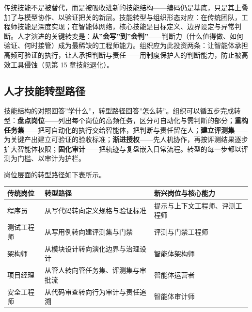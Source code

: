 \documentclass[
]{ctexbook}
\newcounter{none}
\begin{document}
传统技能不是被替代，而是被吸收进新的技能结构------编码仍是基底，只是其上叠加了与模型协作、以验证把关的新层。技能转型与组织形态对应：在传统团队，工程师技能是深度实现；在智能体网络，核心技能是目标定义、边界设定与异常判断。人才演进的关键转变是：\textbf{从''会写''到''会判''}------判断力（什么值得做、如何验证、何时接管）成为最稀缺的工程师能力。组织应为此投资两条：让智能体承担高频可验证的执行，让人承担判断与责任------用制度保护人的判断能力，防止被高效工具侵蚀（见第
15 章技能退化）。

\subsection{人才技能转型路径}\label{ux4ebaux624dux6280ux80fdux8f6cux578bux8defux5f84}

技能结构的对照回答''学什么''，转型路径回答''怎么转''。组织可以循五步完成转型：\textbf{盘点岗位}------列出每个岗位的高频任务，区分可自动化与需判断的部分；\textbf{重构任务集}------把可自动化的执行交给智能体，把判断与责任留在人；\textbf{建立评测集}------为关键产出建立可验证的验收标准；\textbf{渐进授权}------先人机协作，再按评测结果逐步扩大智能体权限；\textbf{固化审计}------把轨迹与复盘嵌入日常流程。转型的每一步都以评测为门槛、以审计为护栏。

岗位层面的转型路径如下表所示。

{\def\LTcaptype{none} %
\begin{longtable}[]{@{}
  >{\raggedright\arraybackslash}p{}
  >{\raggedright\arraybackslash}p{}
  >{\raggedright\arraybackslash}p{}@{}}
\toprule\noalign{}
\begin{minipage}[b]{\linewidth}\raggedright
传统岗位
\end{minipage} & \begin{minipage}[b]{\linewidth}\raggedright
转型路径
\end{minipage} & \begin{minipage}[b]{\linewidth}\raggedright
新兴岗位与核心能力
\end{minipage} \\
\midrule\noalign{}
\endhead
\bottomrule\noalign{}
\endlastfoot
程序员 & 从写代码转向定义规格与验证标准 &
提示与上下文工程师、评测工程师 \\
测试工程师 & 从写用例转向建评测集与门禁 & 评测与门禁工程师 \\
架构师 & 从模块设计转向演化边界与治理设计 & 智能体架构师 \\
项目经理 & 从管人转向管任务集、评测集与审批流 & 智能体运营者 \\
安全工程师 & 从代码审查转向行为审计与责任追溯 & 智能体审计师 \\
\end{longtable}
}
\end{document}

